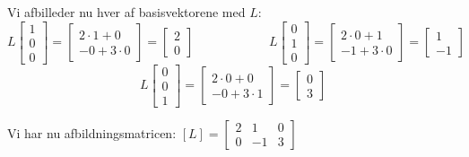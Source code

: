 {Vi afbilleder nu hver af basisvektorene med \(L\):
\[
    L \begin{bmatrix}
        1 \\
        0 \\
        0
    \end{bmatrix} =
    \begin{bmatrix}
        2 \cdot 1 + 0 \\
        -0 + 3 \cdot 0
    \end{bmatrix} =
    \begin{bmatrix}
        2 \\
        0
    \end{bmatrix}
\hspace{6em}
    L \begin{bmatrix}
        0 \\
        1 \\
        0
    \end{bmatrix} =
    \begin{bmatrix}
        2 \cdot 0 + 1 \\
        -1 + 3 \cdot 0
    \end{bmatrix} =
    \begin{bmatrix}
        1 \\
        -1
    \end{bmatrix}
\]
\[
    L \begin{bmatrix}
        0 \\
        0 \\
        1
    \end{bmatrix} =
    \begin{bmatrix}
        2 \cdot 0 + 0 \\
        -0 + 3 \cdot 1
    \end{bmatrix} =
    \begin{bmatrix}
        0 \\
        3
    \end{bmatrix}
\]

Vi har nu afbildningsmatricen:
\(
    [L] =
    \begin{bmatrix}
        2 & 1 & 0 \\
        0 & -1 & 3
    \end{bmatrix}
\)

}
